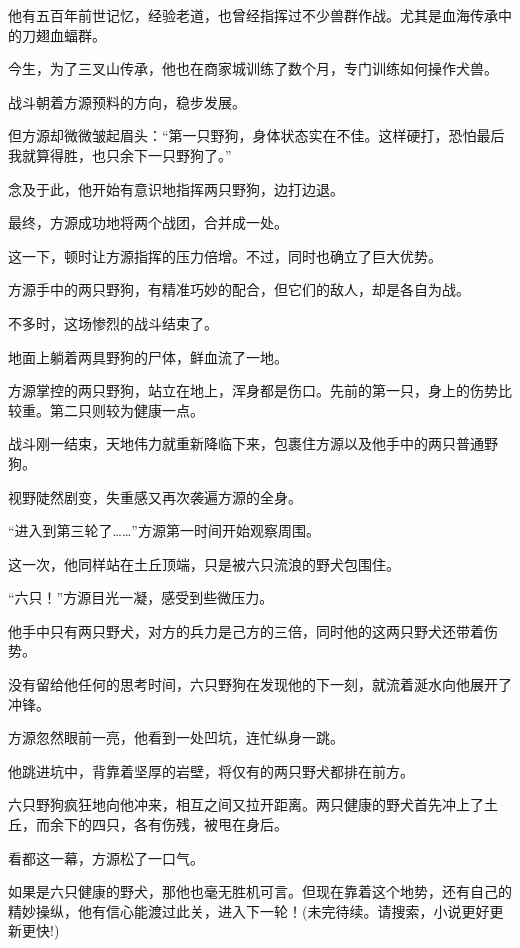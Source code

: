 \begin{this_body}
他有五百年前世记忆，经验老道，也曾经指挥过不少兽群作战。尤其是血海传承中的刀翅血蝠群。

今生，为了三叉山传承，他也在商家城训练了数个月，专门训练如何操作犬兽。

战斗朝着方源预料的方向，稳步发展。

但方源却微微皱起眉头：“第一只野狗，身体状态实在不佳。这样硬打，恐怕最后我就算得胜，也只余下一只野狗了。”

念及于此，他开始有意识地指挥两只野狗，边打边退。

最终，方源成功地将两个战团，合并成一处。

这一下，顿时让方源指挥的压力倍增。不过，同时也确立了巨大优势。

方源手中的两只野狗，有精准巧妙的配合，但它们的敌人，却是各自为战。

不多时，这场惨烈的战斗结束了。

地面上躺着两具野狗的尸体，鲜血流了一地。

方源掌控的两只野狗，站立在地上，浑身都是伤口。先前的第一只，身上的伤势比较重。第二只则较为健康一点。

战斗刚一结束，天地伟力就重新降临下来，包裹住方源以及他手中的两只普通野狗。

视野陡然剧变，失重感又再次袭遍方源的全身。

“进入到第三轮了……”方源第一时间开始观察周围。

这一次，他同样站在土丘顶端，只是被六只流浪的野犬包围住。

“六只！”方源目光一凝，感受到些微压力。

他手中只有两只野犬，对方的兵力是己方的三倍，同时他的这两只野犬还带着伤势。

没有留给他任何的思考时间，六只野狗在发现他的下一刻，就流着涎水向他展开了冲锋。

方源忽然眼前一亮，他看到一处凹坑，连忙纵身一跳。

他跳进坑中，背靠着坚厚的岩壁，将仅有的两只野犬都排在前方。

六只野狗疯狂地向他冲来，相互之间又拉开距离。两只健康的野犬首先冲上了土丘，而余下的四只，各有伤残，被甩在身后。

看都这一幕，方源松了一口气。

如果是六只健康的野犬，那他也毫无胜机可言。但现在靠着这个地势，还有自己的精妙操纵，他有信心能渡过此关，进入下一轮！(未完待续。请搜索，小说更好更新更快!)

\end{this_body}

